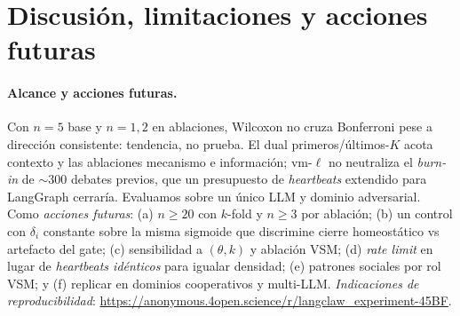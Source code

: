 \documentclass{llncs}
\begin{document}
\section{Discusi\'on, limitaciones y acciones futuras}
\label{sec:discussion}

\paragraph{Alcance y acciones futuras.} Con $n{=}5$ base y
$n{=}1,2$ en ablaciones, Wilcoxon no cruza Bonferroni pese a
direcci\'on consistente: tendencia, no prueba. El dual
primeros/\'ultimos-$K$ acota contexto y las ablaciones mecanismo e
informaci\'on; vm-$\ell$ no neutraliza el \emph{burn-in} de
$\sim$300 debates previos, que un presupuesto de \emph{heartbeats}
extendido para LangGraph cerrar\'ia. Evaluamos sobre un \'unico LLM
y dominio adversarial. Como \emph{acciones futuras}: (a) $n{\geq}20$ con $k$-fold y
$n{\geq}3$ por ablaci\'on; (b) un control con $\delta_i$ constante
sobre la misma sigmoide que discrimine cierre homeost\'atico vs
artefacto del gate; (c) sensibilidad a $(\theta,k)$ y ablaci\'on
VSM; (d) \emph{rate limit} en lugar de \emph{heartbeats id\'enticos}
para igualar densidad; (e) patrones sociales por rol VSM;
y (f) replicar en dominios cooperativos y multi-LLM.
\emph{Indicaciones de reproducibilidad}:
\url{https://anonymous.4open.science/r/langclaw_experiment-45BF}.

{\printbibliography}
\end{document}
